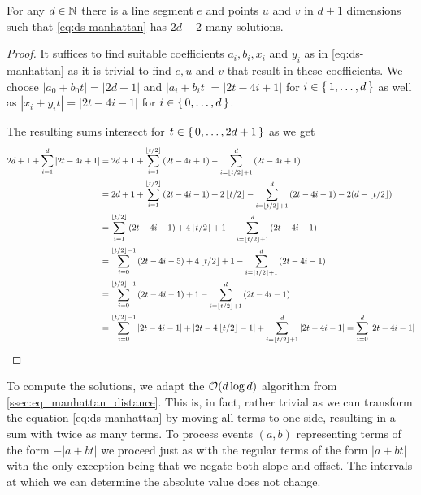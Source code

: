 \begin{lemma}\label{lem:ds-manhattan}
	For any \(d \in \mathbb{N}\) there is a line segment \(e\) and points \(u\) and \(v\) in \(d+1\) dimensions such that \cref{eq:ds-manhattan} has \(2d + 2\) many solutions. 
\end{lemma}

\begin{proof}
	It suffices to find suitable coefficients \(a_i, b_i, x_i\) and \(y_i\) as in \cref{eq:ds-manhattan} as it is trivial to find \(e, u\) and \(v\) that result in these coefficients. We choose \(|a_0 + b_0 t| = |2d +1|\) and \(|a_i + b_i t| = |2t - 4i + 1|\) for \(i \in \set{1, \dots, d}\) as well as \(|x_i + y_i t| = |2t - 4i - 1|\) for \(i \in \set{0, \dots, d}\).

	The resulting sums intersect for \(t \in \set{0, \dots, 2d+1}\) as we get 
	\begin{align*}
		2d+1 + \sum_{i=1}^d \left|2t - 4i + 1\right| &= 2d+1 + \sum_{i=1}^{\left\lfloor t/2\right\rfloor} \left(2t - 4i + 1\right)  - \sum_{i=\left\lfloor t/2\right\rfloor+1}^d \left(2t - 4i + 1\right) \\
		 &= 2d+1 + \sum_{i=1}^{\left\lfloor t/2\right\rfloor} \left(2t - 4i - 1\right) + 2\left\lfloor t/2\right\rfloor - \sum_{i=\left\lfloor t/2\right\rfloor+1}^d \left(2t - 4i - 1\right)  - 2(d-\left\lfloor t/2\right\rfloor)\\
		 &= \sum_{i=1}^{\left\lfloor t/2\right\rfloor} \left(2t - 4i - 1\right) + 4\left\lfloor t/2\right\rfloor + 1 - \sum_{i=\left\lfloor t/2\right\rfloor+1}^d \left(2t - 4i - 1\right) \\
		 &= \sum_{i=0}^{\left\lfloor t/2\right\rfloor-1} \left(2t - 4i - 5\right) + 4\left\lfloor t/2\right\rfloor + 1 - \sum_{i=\left\lfloor t/2\right\rfloor+1}^d \left(2t - 4i - 1\right) \\
		 &= \sum_{i=0}^{\left\lfloor t/2\right\rfloor-1} \left(2t - 4i - 1\right) + 1 - \sum_{i=\left\lfloor t/2\right\rfloor+1}^d \left(2t - 4i - 1\right) \\
		 &= \sum_{i=0}^{\left\lfloor t/2\right\rfloor-1} \left|2t - 4i - 1\right| + \left|2t - 4\left\lfloor t/2\right\rfloor-1\right|+ \sum_{i=\left\lfloor t/2\right\rfloor+1}^d \left|2t - 4i - 1\right| = \sum_{i=0}^d \left|2t - 4i - 1\right|
	\end{align*}
\end{proof}


To compute the solutions, we adapt the \(\mathcal{O}(d\log d)\) algorithm from \cref{ssec:eq_manhattan_distance}. This is, in fact, rather trivial as we can transform the equation \cref{eq:ds-manhattan} by moving all terms to one side, resulting in a sum with twice as many terms. To process events \((a, b)\) representing terms of the form \(-|a + bt|\) we proceed just as with the regular terms of the form \(|a+bt|\) with the only exception being that we negate both slope and offset. The intervals at which we can determine the absolute value does not change.

